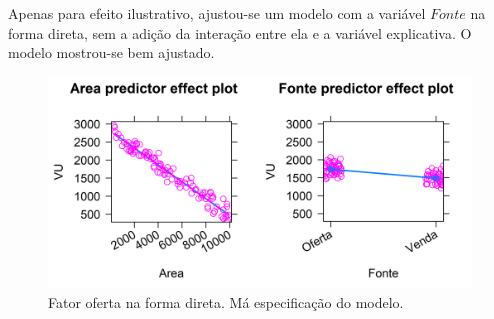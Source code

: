 \documentclass{article}
\begin{document}
Apenas para efeito ilustrativo, ajustou-se um modelo com a variável
\(Fonte\) na forma direta, sem a adição da interação entre ela e a
variável explicativa. O modelo mostrou-se bem ajustado.

\begin{figure}
\centering
\includegraphics{./images/wrongModel-1.png}
\caption{Fator oferta na forma direta. Má especificação do modelo.}
\end{figure}
\end{document}
